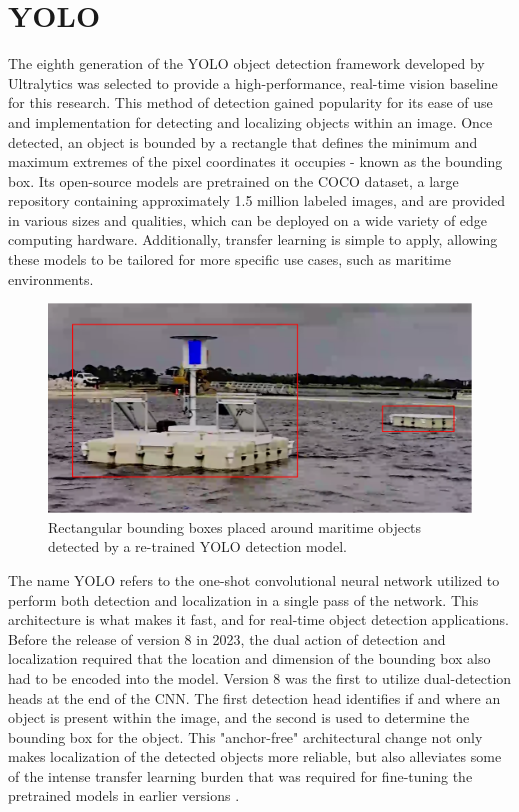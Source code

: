 \documentclass{erauthesis}
\begin{document}
\section{YOLO}
\label{yolo}
The eighth generation of the \ac{YOLO} object detection framework developed by Ultralytics was selected to provide a high-performance, real-time vision baseline for this research. 
This method of detection gained popularity for its ease of use and implementation for detecting and localizing objects within an image.
Once detected, an object is bounded by a rectangle that defines the minimum and maximum extremes of the pixel coordinates it occupies - known as the bounding box.
Its open-source models are pretrained on the COCO dataset, a large repository containing approximately 1.5 million labeled images, and are provided in various sizes and qualities, which can be deployed on a wide variety of edge computing hardware.
Additionally, transfer learning is simple to apply, allowing these models to be tailored for more specific use cases, such as maritime environments.

\begin{figure}
    \centering
    \includegraphics[width=0.5\linewidth]{Images/YOLO_ex1.png}
    \caption{Rectangular bounding boxes placed around maritime objects detected by a re-trained YOLO detection model.}
    \label{fig:YOLO_tower}
\end{figure}

The name YOLO refers to the one-shot convolutional neural network utilized to perform both detection and localization in a single pass of the network.
This architecture is what makes it fast, and for real-time object detection applications. 
Before the release of version 8 in 2023, the dual action of detection and localization required that the location and dimension of the bounding box also had to be encoded into the model.
Version 8 was the first to utilize dual-detection heads at the end of the CNN.
The first detection head identifies if and where an object is present within the image, and the second is used to determine the bounding box for the object.
This "anchor-free" architectural change not only makes localization of the detected objects more reliable, but also alleviates some of the intense transfer learning burden that was required for fine-tuning the pretrained models in earlier versions \cite{ultralytics}.
\end{document}
